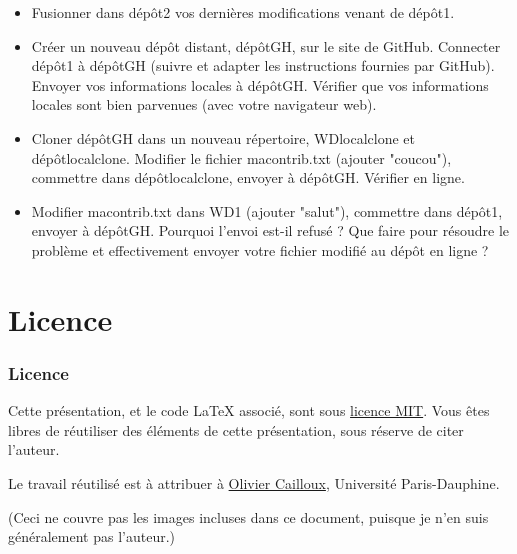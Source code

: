 \documentclass[english, french]{beamer}
\begin{document}
\begin{frame}[allowframebreaks]
\begin{itemize}
		\item Fusionner dans dépôt2 vos dernières modifications venant de dépôt1.
		\item Créer un nouveau dépôt distant, dépôtGH, sur le site de GitHub. Connecter dépôt1 à dépôtGH (suivre et adapter les instructions fournies par GitHub). Envoyer vos informations locales à dépôtGH. Vérifier que vos informations locales sont bien parvenues (avec votre navigateur web).
		\item Cloner dépôtGH dans un nouveau répertoire, WDlocalclone et dépôtlocalclone. Modifier le fichier macontrib.txt (ajouter "coucou"), commettre dans dépôtlocalclone, envoyer à dépôtGH. Vérifier en ligne.
		\item Modifier macontrib.txt dans WD1 (ajouter "salut"), commettre dans dépôt1, envoyer à dépôtGH. Pourquoi l’envoi est-il refusé ? Que faire pour résoudre le problème et effectivement envoyer votre fichier modifié au dépôt en ligne ?
	\end{itemize}
\end{frame}

\section{Licence}
\begin{frame}
	\frametitle{Licence}
	Cette présentation, et le code LaTeX associé, sont sous \href{http://opensource.org/licenses/MIT}{licence MIT}. Vous êtes libres de réutiliser des éléments de cette présentation, sous réserve de citer l’auteur.
	
	Le travail réutilisé est à attribuer à \href{http://www.lamsade.dauphine.fr/~ocailloux/}{Olivier Cailloux}, Université Paris-Dauphine.
	
	\small{(Ceci ne couvre pas les images incluses dans ce document, puisque je n’en suis généralement pas l’auteur.)}
\end{frame}
\end{document}
